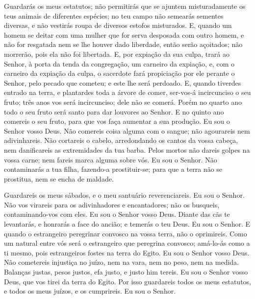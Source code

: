 Guardarás os meus estatutos; não permitirás que se ajuntem
misturadamente os teus animais de diferentes espécies; no teu campo
não semearás sementes diversas, e não vestirás roupa de diversos
estofos misturados. E, quando um homem se deitar com uma
mulher que for serva desposada com outro homem, e não for resgatada
nem se lhe houver dado liberdade, então serão açoitados; não
morrerão, pois ela não foi libertada. E, por expiação da sua
culpa, trará ao Senhor, à porta da tenda da congregação, um carneiro
da expiação, e, com o carneiro da expiação da culpa, o
sacerdote fará propiciação por ele perante o Senhor, pelo pecado que
cometeu; e este lhe será perdoado. E, quando tiverdes entrado
na terra, e plantardes toda a árvore de comer, ser-vos-á
incircunciso o seu fruto; três anos vos será incircunciso; dele não
se comerá. Porém no quarto ano todo o seu fruto será santo
para dar louvores ao Senhor. E no quinto ano comereis o seu
fruto, para que vos faça aumentar a sua produção. Eu sou o Senhor
vosso Deus. Não comereis coisa alguma com o sangue; não
agourareis nem adivinhareis. Não cortareis o cabelo,
arredondando os cantos da vossa cabeça, nem danificareis as
extremidades da tua barba. Pelos mortos não dareis golpes na
vossa carne; nem fareis marca alguma sobre vós. Eu sou o Senhor.
Não contaminarás a tua filha, fazendo-a prostituir-se; para
que a terra não se prostitua, nem se encha de maldade.

Guardareis os meus sábados, e o meu santuário reverenciareis. Eu
sou o Senhor. Não vos virareis para os adivinhadores e
encantadores; não os busqueis, contaminando-vos com eles. Eu sou o
Senhor vosso Deus. Diante das cãs te levantarás, e honrarás a
face do ancião; e temerás o teu Deus. Eu sou o Senhor. E
quando o estrangeiro peregrinar convosco na vossa terra, não o
oprimireis. Como um natural entre vós será o estrangeiro que
peregrina convosco; amá-lo-ás como a ti mesmo, pois estrangeiros
fostes na terra do Egito. Eu sou o Senhor vosso Deus. Não
cometereis injustiça no juízo, nem na vara, nem no peso, nem na
medida. Balanças justas, pesos justos, efa justo, e justo him
tereis. Eu sou o Senhor vosso Deus, que vos tirei da terra do Egito.
Por isso guardareis todos os meus estatutos, e todos os meus
juízos, e os cumprireis. Eu sou o Senhor.

\medskip

